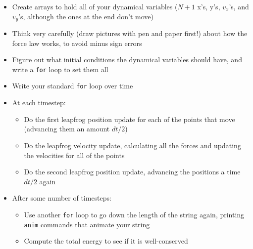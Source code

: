 \documentclass[12ampt]{article}
\begin{document}
\begin{itemize}
  \item{Create arrays to hold all of your dynamical variables ($N+1$ x's, y's, $v_x$'s, and $v_y$'s, although the ones at the end don't move)}
  \item{Think very carefully (draw pictures with pen and paper first!) about how the force law works, to avoid minus sign errors}
  \item{Figure out what initial conditions the dynamical variables should have, and write a {\tt for} loop to set them all}
  \item{Write your standard {\tt for} loop over time}
  \item{At each timestep:}
    \begin{itemize}
\item Do the first leapfrog position update for each of the points that move (advancing them an amount $dt/2$)
\item Do the leapfrog velocity update, calculating all the forces and updating the velocities for all of the points
\item Do the second leapfrog position update, advancing the positions a time $dt/2$ again
    \end{itemize}
  \item{After some number of timesteps:}
    \begin{itemize}
      \item{Use another {\tt for} loop to go down the length of the string again, printing {\tt anim} commands that animate your string}
      \item{Compute the total energy to see if it is well-conserved}
    \end{itemize}
\end{itemize}
\end{document}
